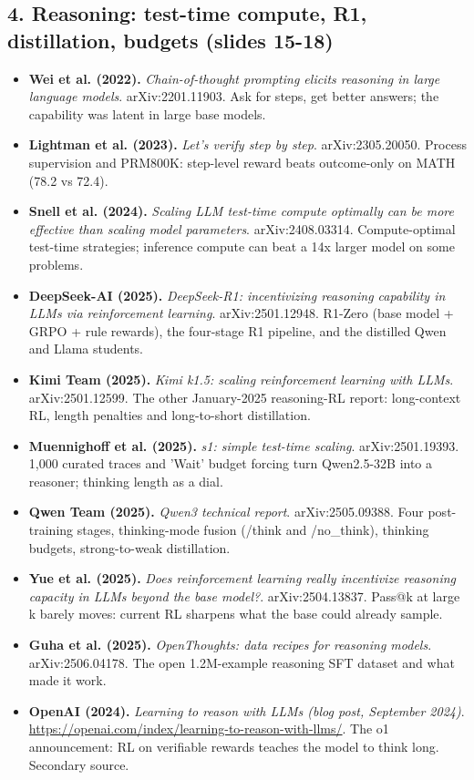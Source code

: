 \documentclass[11pt,letterpaper]{article}
\begin{document}
\subsection*{4. Reasoning: test-time compute, R1, distillation, budgets (slides 15-18)}
\begin{itemize}[leftmargin=1.2em,itemsep=3pt]\sloppy
\item \textbf{Wei et al. (2022).} \textit{Chain-of-thought prompting elicits reasoning in large language models}. arXiv:2201.11903. Ask for steps, get better answers; the capability was latent in large base models.
\item \textbf{Lightman et al. (2023).} \textit{Let's verify step by step}. arXiv:2305.20050. Process supervision and PRM800K: step-level reward beats outcome-only on MATH (78.2 vs 72.4).
\item \textbf{Snell et al. (2024).} \textit{Scaling LLM test-time compute optimally can be more effective than scaling model parameters}. arXiv:2408.03314. Compute-optimal test-time strategies; inference compute can beat a 14x larger model on some problems.
\item \textbf{DeepSeek-AI (2025).} \textit{DeepSeek-R1: incentivizing reasoning capability in LLMs via reinforcement learning}. arXiv:2501.12948. R1-Zero (base model + GRPO + rule rewards), the four-stage R1 pipeline, and the distilled Qwen and Llama students.
\item \textbf{Kimi Team (2025).} \textit{Kimi k1.5: scaling reinforcement learning with LLMs}. arXiv:2501.12599. The other January-2025 reasoning-RL report: long-context RL, length penalties and long-to-short distillation.
\item \textbf{Muennighoff et al. (2025).} \textit{s1: simple test-time scaling}. arXiv:2501.19393. 1,000 curated traces and 'Wait' budget forcing turn Qwen2.5-32B into a reasoner; thinking length as a dial.
\item \textbf{Qwen Team (2025).} \textit{Qwen3 technical report}. arXiv:2505.09388. Four post-training stages, thinking-mode fusion (/think and /no\_think), thinking budgets, strong-to-weak distillation.
\item \textbf{Yue et al. (2025).} \textit{Does reinforcement learning really incentivize reasoning capacity in LLMs beyond the base model?}. arXiv:2504.13837. Pass@k at large k barely moves: current RL sharpens what the base could already sample.
\item \textbf{Guha et al. (2025).} \textit{OpenThoughts: data recipes for reasoning models}. arXiv:2506.04178. The open 1.2M-example reasoning SFT dataset and what made it work.
\item \textbf{OpenAI (2024).} \textit{Learning to reason with LLMs (blog post, September 2024)}. \url{https://openai.com/index/learning-to-reason-with-llms/}. The o1 announcement: RL on verifiable rewards teaches the model to think long. Secondary source.
\end{itemize}
\end{document}
